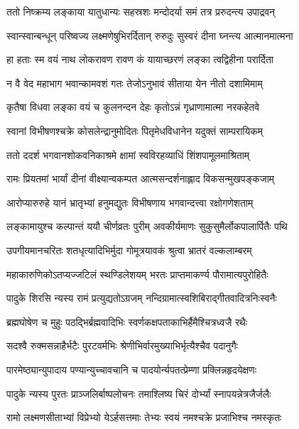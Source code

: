 \twolineshloka
{ततो निष्क्रम्य लङ्काया यातुधान्यः सहस्रशः}
{मन्दोदर्या समं तत्र प्ररुदन्त्य उपाद्रवन्} %

\twolineshloka
{स्वान्स्वान्बन्धून् परिष्वज्य लक्ष्मणेषुभिरर्दितान्}
{रुरुदुः सुस्वरं दीना घ्नन्त्य आत्मानमात्मना} %

\twolineshloka
{हा हताः स्म वयं नाथ लोकरावण रावण}
{कं यायाच्छरणं लङ्का त्वद्विहीना परार्दिता} %

\twolineshloka
{न वै वेद महाभाग भवान्कामवशं गतः}
{तेजोऽनुभावं सीताया येन नीतो दशामिमाम्} %

\twolineshloka
{कृतैषा विधवा लङ्का वयं च कुलनन्दन}
{देहः कृतोऽन्नं गृध्राणामात्मा नरकहेतवे} %


\twolineshloka
{स्वानां विभीषणश्चक्रे कोसलेन्द्रानुमोदितः}
{पितृमेधविधानेन यदुक्तं साम्परायिकम्} %

\twolineshloka
{ततो ददर्श भगवानशोकवनिकाश्रमे}
{क्षामां स्वविरहव्याधिं शिंशपामूलमाश्रिताम्} %

\twolineshloka
{रामः प्रियतमां भार्यां दीनां वीक्ष्यान्वकम्पत}
{आत्मसन्दर्शनाह्लाद विकसन्मुखपङ्कजाम्} %

\twolineshloka
{आरोप्यारुरुहे यानं भ्रातृभ्यां हनुमद्युतः}
{विभीषणाय भगवान्दत्त्वा रक्षोगणेशताम्} %

\twolineshloka
{लङ्कामायुश्च कल्पान्तं ययौ चीर्णव्रतः पुरीम्}
{अवकीर्यमाणः सुकुसुमैर्लोकपालार्पितैः पथि} %

\twolineshloka
{उपगीयमानचरितः शतधृत्यादिभिर्मुदा}
{गोमूत्रयावकं श्रुत्वा भ्रातरं वल्कलाम्बरम्} %

\twolineshloka
{महाकारुणिकोऽतप्यज्जटिलं स्थण्डिलेशयम्}
{भरतः प्राप्तमाकर्ण्य पौरामात्यपुरोहितैः} %

\twolineshloka
{पादुके शिरसि न्यस्य रामं प्रत्युद्यतोऽग्रजम्}
{नन्दिग्रामात्स्वशिबिराद्गीतवादित्रनिःस्वनैः} %

\twolineshloka
{ब्रह्मघोषेण च मुहुः पठद्भिर्ब्रह्मवादिभिः}
{स्वर्णकक्षपताकाभिर्हैमैश्चित्रध्वजै रथैः} %

\twolineshloka
{सदश्वै रुक्मसन्नाहैर्भटैः पुरटवर्मभिः}
{श्रेणीभिर्वारमुख्याभिर्भृत्यैश्चैव पदानुगैः} %

\twolineshloka
{पारमेष्ठ्यान्युपादाय पण्यान्युच्चावचानि च}
{पादयोर्न्यपतत्प्रेम्णा प्रक्लिन्नहृदयेक्षणः} %

\twolineshloka
{पादुके न्यस्य पुरतः प्राञ्जलिर्बाष्पलोचनः}
{तमाश्लिष्य चिरं दोर्भ्यां स्नापयन्नेत्रजैर्जलैः} %

\twolineshloka
{रामो लक्ष्मणसीताभ्यां विप्रेभ्यो येऽर्हसत्तमाः}
{तेभ्यः स्वयं नमश्चक्रे प्रजाभिश्च नमस्कृतः} %

